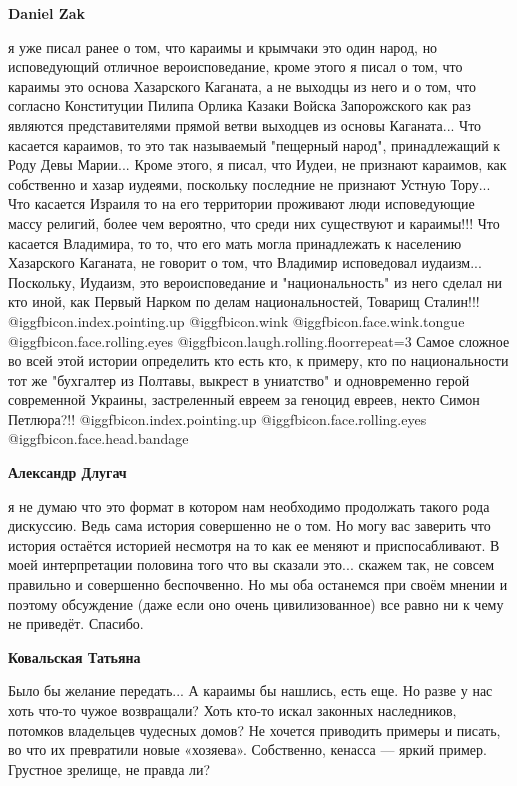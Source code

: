 \begin{itemize}
\begin{itemize}
\begin{itemize}
\textbf{Daniel Zak} 

я уже писал ранее о том, что караимы и крымчаки это один народ, но исповедующий
отличное вероисповедание, кроме этого я писал о том, что караимы это основа
Хазарского Каганата, а не выходцы из него и о том, что согласно Конституции
Пилипа Орлика Казаки Войска Запорожского как раз являются представителями
прямой ветви выходцев из основы Каганата... Что касается караимов, то это так
называемый "пещерный народ", принадлежащий к Роду Девы Марии... Кроме этого, я
писал, что Иудеи, не признают караимов, как собственно и хазар иудеями,
поскольку последние не признают Устную Тору... Что касается Израиля то на его
территории проживают люди исповедующие массу религий, более чем вероятно, что
среди них существуют и караимы!!! Что касается Владимира, то то, что его мать
могла принадлежать к населению Хазарского Каганата, не говорит о том, что
Владимир исповедовал иудаизм... Поскольку, Иудаизм, это вероисповедание и
"национальность" из него сделал ни кто иной, как Первый Нарком по делам
национальностей, Товарищ Сталин!!! @igg{fbicon.index.pointing.up}
@igg{fbicon.wink}  @igg{fbicon.face.wink.tongue}
@igg{fbicon.face.rolling.eyes}  @igg{fbicon.laugh.rolling.floor}{repeat=3}
Самое сложное во всей этой истории определить кто есть кто, к примеру, кто по
национальности тот же "бухгалтер из Полтавы, выкрест в униатство" и
одновременно герой современной Украины, застреленный евреем за геноцид евреев,
некто Симон Петлюра?!! @igg{fbicon.index.pointing.up}
@igg{fbicon.face.rolling.eyes}  @igg{fbicon.face.head.bandage} 

\textbf{Александр Длугач} 

я не думаю что это формат в котором нам необходимо продолжать такого рода
дискуссию. Ведь сама история совершенно не о том. Но могу вас заверить что
история остаётся историей несмотря на то как ее меняют и приспосабливают. В
моей интерпретации половина того что вы сказали это... скажем так, не совсем
правильно и совершенно беспочвенно. Но мы оба останемся при своём мнении и
поэтому обсуждение (даже если оно очень цивилизованное) все равно ни к чему не
приведёт. Спасибо.

\end{itemize} %

\textbf{Ковальская Татьяна} 

Было бы желание передать... А караимы бы нашлись, есть еще. Но разве у нас хоть
что-то чужое возвращали? Хоть кто-то искал законных наследников, потомков
владельцев чудесных домов? Не хочется приводить примеры и писать, во что их
превратили новые «хозяева». Собственно, кенасса — яркий пример. Грустное
зрелище, не правда ли?


\end{itemize}
\end{itemize}
